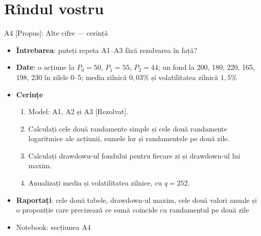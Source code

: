 \section{Rîndul vostru}

\begin{frame}{A4 [Propus]: Alte cifre --- cerință}
\itemsize{\small}
\begin{itemize}
\item \textbf{Întrebarea}: puteți repeta A1--A3 fără rezolvarea în față?
\item \textbf{Date}: o acțiune la $P_0 = 50$, $P_1 = 55$, $P_2 = 44$; un fond la 200, 180, 220, 165, 198, 230 în zilele 0--5; media zilnică $0{,}03\%$ și volatilitatea zilnică $1{,}5\%$
\item \textbf{Cerințe}
\begin{enumerate}
    \item Model: A1, A2 și A3 [Rezolvat].
    \item Calculați cele două randamente simple și cele două randamente logaritmice ale acțiunii, sumele lor și randamentele pe două zile.
    \item Calculați drawdown-ul fondului pentru fiecare zi și drawdown-ul lui maxim.
    \item Anualizați media și volatilitatea zilnice, cu $q = 252$.
\end{enumerate}
\item \textbf{Raportați}: cele două tabele, drawdown-ul maxim, cele două valori anuale și o propoziție care precizează ce sumă coincide cu randamentul pe două zile
\item Notebook: secțiunea A4
\end{itemize}
\end{frame}

